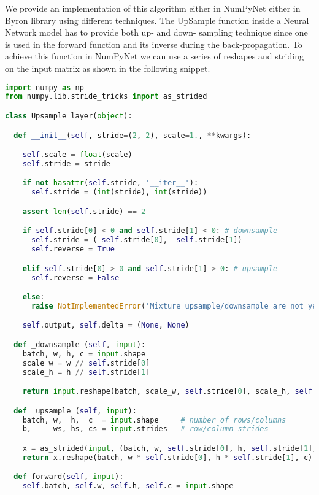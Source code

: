 \documentclass{standalone}
\begin{document}
We provide an implementation of this algorithm either in NumPyNet either in Byron library using different techniques.
The UpSample function inside a Neural Network model has to provide both up- and down- sampling technique since one is used in the forward function and its inverse during the back-propagation.
To achieve this function in NumPyNet we can use a series of reshapes and striding on the input matrix as shown in the following snippet.

\lstset{style=snippet}
\begin{lstlisting}[language=Python, caption=NumPyNet version of Upsampling function, label=code:py_upsample]
import numpy as np
from numpy.lib.stride_tricks import as_strided

class Upsample_layer(object):

  def __init__(self, stride=(2, 2), scale=1., **kwargs):

    self.scale = float(scale)
    self.stride = stride

    if not hasattr(self.stride, '__iter__'):
      self.stride = (int(stride), int(stride))

    assert len(self.stride) == 2

    if self.stride[0] < 0 and self.stride[1] < 0: # downsample
      self.stride = (-self.stride[0], -self.stride[1])
      self.reverse = True

    elif self.stride[0] > 0 and self.stride[1] > 0: # upsample
      self.reverse = False

    else:
      raise NotImplementedError('Mixture upsample/downsample are not yet implemented')

    self.output, self.delta = (None, None)

  def _downsample (self, input):
    batch, w, h, c = input.shape
    scale_w = w // self.stride[0]
    scale_h = h // self.stride[1]

    return input.reshape(batch, scale_w, self.stride[0], scale_h, self.stride[1], c).mean(axis=(2, 4))

  def _upsample (self, input):
    batch, w,  h,  c  = input.shape     # number of rows/columns
    b,     ws, hs, cs = input.strides   # row/column strides

    x = as_strided(input, (batch, w, self.stride[0], h, self.stride[1], c), (b, ws, 0, hs, 0, cs)) # view a as larger 4D array
    return x.reshape(batch, w * self.stride[0], h * self.stride[1], c)                                     # create new 2D array

  def forward(self, input):
    self.batch, self.w, self.h, self.c = input.shape


\end{lstlisting}
\end{document}
